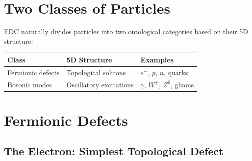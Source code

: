 \section{Two Classes of Particles}
\label{sec:two_classes}

EDC naturally divides particles into two ontological categories based on their
5D structure:

\begin{center}
\begin{tabular}{lll}
\toprule
\textbf{Class} & \textbf{5D Structure} & \textbf{Examples} \\
\midrule
Fermionic defects & Topological solitons & $e^-$, $p$, $n$, quarks \\
Bosonic modes & Oscillatory excitations & $\gamma$, $W^\pm$, $Z^0$, gluons \\
\bottomrule
\end{tabular}
\end{center}

\section{Fermionic Defects}
\label{sec:fermionic_defects}

\subsection{The Electron: Simplest Topological Defect}

